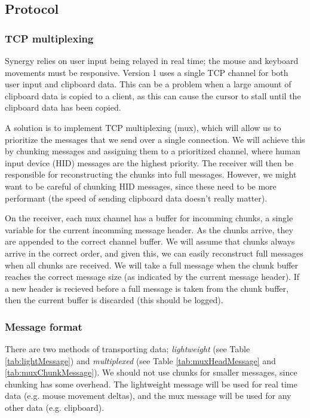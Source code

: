\subsection{Protocol}

\subsubsection{TCP multiplexing}

Synergy relies on user input being relayed in real time; the mouse and keyboard
movements must be responsive. Version 1 uses a single TCP channel for both user
input and clipboard data. This can be a problem when a large amount of clipboard
data is copied to a client, as this can cause the cursor to stall until the
clipboard data has been copied.

A solution is to implement TCP multiplexing (mux), which will 
allow us to prioritize the messages that we send over a single connection. We
will achieve this by chunking messages and assigning them to a prioritized channel,
where human input device (HID) messages are the highest priority. The
receiver will then be responsible for reconstructing the chunks into full 
messages. However, we might want to be careful of chunking HID messages, since 
these need to be more performant (the speed of sending clipboard data doesn't 
really matter).

On the receiver, each mux channel has a buffer for incomming chunks, a single
variable for the current incomming message header. As the chunks arrive, they
are appended to the correct channel buffer. We will assume that chunks always
arrive in the correct order, and given this, we can easily reconstruct full
messages when all chunks are received. We will take a full message when the
chunk buffer reaches the correct message size (as indicated by the current
message header). If a new header is recieved before a full message is taken
from the chunk buffer, then the current buffer is discarded (this should be
logged).

\subsubsection{Message format}

There are two methods of transporting data; \textit{lightweight} (see Table
\ref{tab:lightMessage}) and \textit{multiplexed} (see Table
\ref{tab:muxHeadMessage} and \ref{tab:muxChunkMessage}). We should not use 
chunks for smaller messages, since chunking has some overhead. The lightweight
message will be used for real time data (e.g. mouse movement deltas), and the
mux message will be used for any other data (e.g. clipboard).

